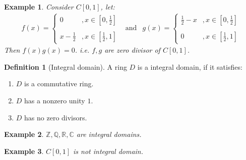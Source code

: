 \documentclass{article}
\theoremstyle{MyNonumberplain}
\theoremstyle{break}
\newcommand{\tmop}{\text}
\theoremstyle{break}
\newtheorem{example}{Example}[section]
\theoremstyle{break}
\theoremstyle{definition}
\theoremstyle{break}
\newtheorem{definition}{Definition}[section]
\begin{document}
\begin{expbox}
    \begin{example}
        Consider $C [0, 1]$, let:
        \begin{eqnarray*}
          f (x) = \left\{\begin{array}{ll}
            0 & , x \in \left[ 0, \frac{1}{2} \right]\\\\
            x - \frac{1}{2} & , x \in \left[ \frac{1}{2}, 1 \right]
          \end{array}\right. & \tmop{and} & g (x) = \left\{\begin{array}{ll}
            \frac{1}{2} - x & , x \in \left[ 0, \frac{1}{2} \right]\\\\
            0 & , x \in \left[ \frac{1}{2}, 1 \right]
          \end{array}\right.
        \end{eqnarray*}
        Then $f (x) g (x) = 0$. i.e. $f, g$ are zero divisor of $C [0, 1]$.
    \end{example}
\end{expbox}

\begin{defbox}
    \begin{definition}[Integral domain]
        A ring $D$ is a integral domain, if it satisfies:\bigskip
        \begin{enumerate}
          \item $D$ is a commutative ring.\bigskip
          
          \item $D$ has a nonzero unity $1$.\bigskip
          
          \item $D$ has no zero divisors.
        \end{enumerate}
    \end{definition}
\end{defbox}

\begin{expbox}
    \begin{example}
        $\mathbb{Z}, \mathbb{Q}, \mathbb{R}, \mathbb{C}$ are integral domains.
    \end{example}
\end{expbox}

\begin{expbox}
    \begin{example}
        $C [0, 1]$ is not integral domain.
    \end{example}
\end{expbox}
\end{document}
